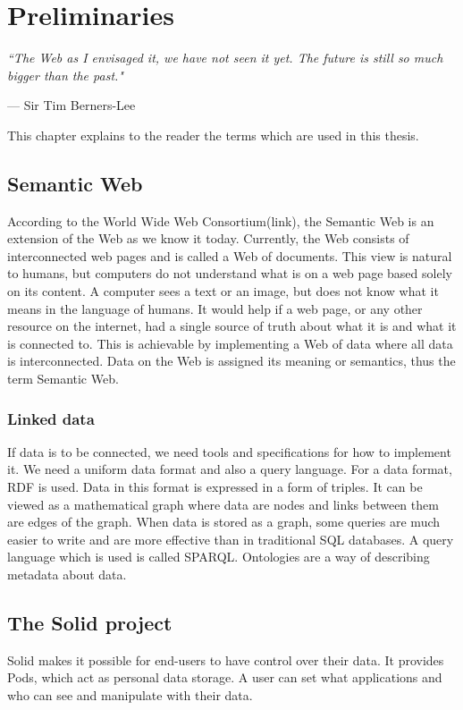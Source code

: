 \setlength{\epigraphwidth}{.5\textwidth}
\setlength\epigraphrule{0pt}

\chapter{Preliminaries}
\epigraph{\textit{``The Web as I envisaged it, we have not seen it yet. The future is still so much bigger than the past."}}{--- Sir Tim Berners-Lee}

This chapter explains to the reader the terms which are used in this thesis.


\section{Semantic Web}
According to the World Wide Web Consortium(link), the Semantic Web is an extension of the Web as we know it today.
Currently, the Web consists of interconnected web pages and is called a Web of documents.
This view is natural to humans, but computers do not understand what is on a web page based solely on its content. 
A computer sees a text or an image, but does not know what it means in the language of humans.
It would help if a web page, or any other resource on the internet, had a single source of truth about what it is and what it is connected to.
This is achievable by implementing a Web of data where all data is interconnected.
Data on the Web is assigned its meaning or semantics, thus the term Semantic Web.

\subsection*{Linked data}
If data is to be connected, we need tools and specifications for how to implement it.
We need a uniform data format and also a query language.
For a data format, RDF is used.
Data in this format is expressed in a form of triples.
It can be viewed as a mathematical graph where data are nodes and links between them are edges of the graph.
When data is stored as a graph, some queries are much easier to write and are more effective than in traditional SQL databases.
A query language which is used is called SPARQL.
Ontologies are a way of describing metadata about data.

\section{The Solid project}
Solid makes it possible for end-users to have control over their data.
It provides Pods, which act as personal data storage.
A user can set what applications and who can see and manipulate with their data.
